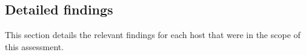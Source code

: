 \subsection{Detailed findings}
This section details the relevant findings for each host that were in the scope of this assessment.

